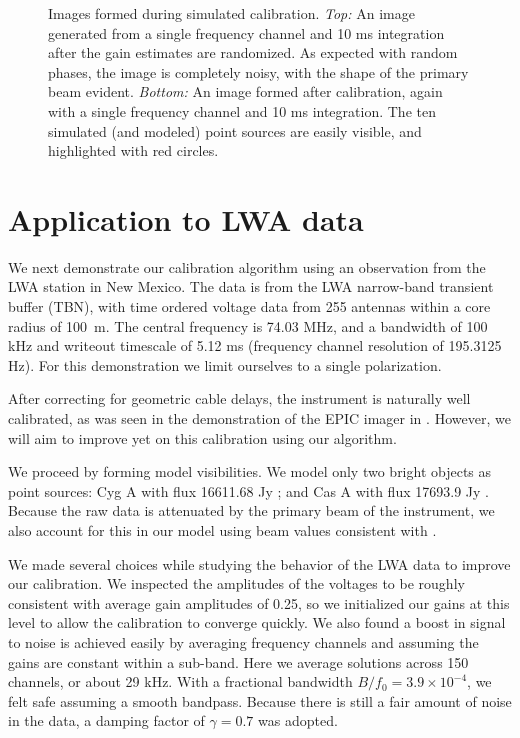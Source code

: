 \documentclass[a4paper,fleqn,usenatbib]{../mnras}
\begin{document}
\begin{figure}
\begin{center}
\caption{Images formed during simulated calibration. \emph{Top:} An image generated from a single frequency channel and 10 ms integration after the gain estimates are randomized. As expected with random phases, the image is completely noisy, with the shape of the primary beam evident. \emph{Bottom:} An image formed after calibration, again with a single frequency channel and 10 ms integration. The ten simulated (and modeled) point sources are easily visible, and highlighted with red circles.
}
\label{fig:sim_images}
\end{center}
\end{figure}

\section{Application to LWA data}\label{sec:data}
We next demonstrate our calibration algorithm using an observation from the LWA station in New Mexico. The data is from the LWA narrow-band transient buffer (TBN), with time ordered voltage data from 255 antennas within a core radius of 100~m. The central frequency is 74.03 MHz, and a bandwidth of 100 kHz and writeout timescale of 5.12 ms (frequency channel resolution of 195.3125 Hz). For this demonstration we limit ourselves to a single polarization.

After correcting for geometric cable delays, the instrument is naturally well calibrated, as was seen in the demonstration of the EPIC imager in \citealt{thy15c}. However, we will aim to improve yet on this calibration using our algorithm.

We proceed by forming model visibilities. We model only two bright objects as point sources: Cyg A with flux 16611.68 Jy \citep{coh07}; and Cas A with flux 17693.9 Jy \citep{kas07}. Because the raw data is attenuated by the primary beam of the instrument, we also account for this in our model using beam values consistent with \cite{hic12}.

We made several choices while studying the behavior of the LWA data to improve our calibration. We inspected the amplitudes of the voltages to be roughly consistent with average gain amplitudes of 0.25, so we initialized our gains at this level to allow the calibration to converge quickly. We also found a boost in signal to noise is achieved easily by averaging frequency channels and assuming the gains are constant within a sub-band. Here we average solutions across 150 channels, or about 29 kHz. With a fractional bandwidth $B/f_0 = 3.9 \times 10^{-4}$, we felt safe assuming a smooth bandpass. Because there is still a fair amount of noise in the data, a damping factor of $\gamma = 0.7$ was adopted.
\end{document}
